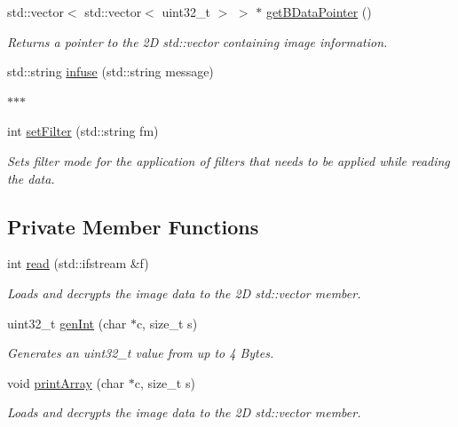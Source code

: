 \begin{DoxyCompactItemize}
std\+::vector$<$ std\+::vector$<$ uint32\+\_\+t $>$ $>$ $\ast$ \mbox{\hyperlink{classBitmapArray_ab914d6282460b386b2b5f936190487a2}{get\+B\+Data\+Pointer}} ()
\begin{DoxyCompactList}\small\item\em Returns a pointer to the 2D std\+::vector containing image information. \end{DoxyCompactList}\item 
std\+::string \mbox{\hyperlink{classBitmapArray_a60edd8332724d4eb1ca37c91f0fefdc8}{infuse}} (std\+::string message)
\begin{DoxyCompactList}\small\item\em $\ast$$\ast$$\ast$ \end{DoxyCompactList}\item 
int \mbox{\hyperlink{classBitmapArray_a432bda57a77788bfd54e3310c9e83c0c}{set\+Filter}} (std\+::string fm)
\begin{DoxyCompactList}\small\item\em Sets filter mode for the application of filters that needs to be applied while reading the data. \end{DoxyCompactList}\end{DoxyCompactItemize}
\subsection*{Private Member Functions}
\begin{DoxyCompactItemize}
\item 
int \mbox{\hyperlink{classBitmapArray_a3a5834d03cd095769b422d4d66b9435f}{read}} (std\+::ifstream \&f)
\begin{DoxyCompactList}\small\item\em Loads and decrypts the image data to the 2D std\+::vector member. \end{DoxyCompactList}\item 
uint32\+\_\+t \mbox{\hyperlink{classBitmapArray_a158fbbaa026332a732f644a8c368a2f0}{gen\+Int}} (char $\ast$c, size\+\_\+t s)
\begin{DoxyCompactList}\small\item\em Generates an uint32\+\_\+t value from up to 4 Bytes. \end{DoxyCompactList}\item 
void \mbox{\hyperlink{classBitmapArray_a99a8a164e51e29407f24dab4752232c1}{print\+Array}} (char $\ast$c, size\+\_\+t s)
\begin{DoxyCompactList}\small\item\em Loads and decrypts the image data to the 2D std\+::vector member. \end{DoxyCompactList}\end{DoxyCompactItemize}
